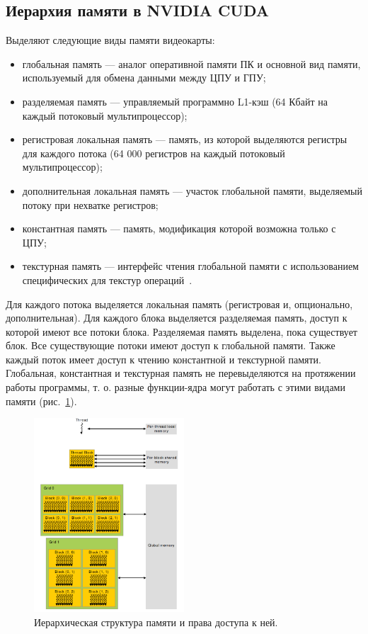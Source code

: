\subsection{Иерархия памяти в NVIDIA CUDA}

Выделяют следующие виды памяти видеокарты:
\begin{itemize}
\item глобальная память --- аналог оперативной памяти ПК и основной вид памяти, используемый для обмена данными между ЦПУ и ГПУ;
\item разделяемая память --- управляемый программно L1-кэш (64 Кбайт на
каждый потоковый мультипроцессор);
\item регистровая локальная память --- память, из которой выделяются регистры для каждого потока (64 000 регистров на каждый потоковый мультипроцессор);
\item дополнительная локальная память --- участок глобальной памяти, выделяемый потоку при нехватке регистров;
\item константная память --- память, модификация которой возможна только с ЦПУ;
\item текстурная память --- интерфейс чтения глобальной памяти с использованием специфических для текстур операций~\cite{CUDAToolkitDocumentation}.
\end{itemize}

Для каждого потока выделяется локальная память (регистровая и, опционально, дополнительная). Для каждого блока выделяется разделяемая память,
доступ к которой имеют все потоки блока. Разделяемая память выделена,
пока существует блок. Все существующие потоки имеют доступ к глобальной
памяти. Также каждый поток имеет доступ к чтению константной и текстурной
памяти. Глобальная, константная и текстурная память не перевыделяются на
протяжении работы программы, т. о. разные функции-ядра могут работать с
этими видами памяти (рис.~\ref{fig:MemoryStructure}).

\begin{figure}[p]
\centering
\includegraphics[width=0.5\textwidth]{include/graphics/image3}
\caption{Иерархическая структура памяти и права доступа к ней.}
\label{fig:MemoryStructure}
\end{figure}


